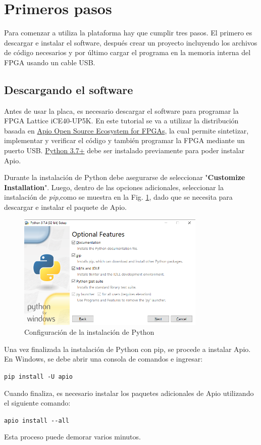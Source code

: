 \documentclass[11pt, a4paper, oneside]{article}
\begin{document}
\section{Primeros pasos}
Para comenzar a utiliza la plataforma hay que cumplir tres pasos. El primero es descargar e instalar el software, después crear un proyecto incluyendo los archivos de código necesarios y por último cargar el programa en la memoria interna del FPGA usando un cable USB.

\subsection{Descargando el software}
Antes de usar la placa, es necesario descargar el software para programar la FPGA Lattice iCE40-UP5K. En este tutorial se va a utilizar la distribución basada en \href{https://apiodoc.readthedocs.io/en/stable/index.html}{Apio Open Source Ecosystem for FPGAs}, la cual permite sintetizar, implementar y verificar el código y también programar la FPGA mediante un puerto USB. \href{https://apiodoc.readthedocs.io/en/stable/index.html}{Python 3.7+} debe ser instalado previamente para poder instalar Apio.

Durante la instalación de Python debe asegurarse de seleccionar "\textbf{Customize Installation}". Luego, dentro de las opciones adicionales, seleccionar la instalación de \textit{pip},como se muestra en la Fig. \ref{fig2}, dado que se necesita para descargar e instalar el paquete de Apio.

\begin{figure}[h!]
    \centering
    \includegraphics[width=0.8\textwidth]{figs/python_install.png}
    \caption{Configuración de la instalación de Python}
    \label{fig2}
\end{figure}

Una vez finalizada la instalación de Python con pip, se procede a instalar Apio. En Windows, se debe abrir una consola de comandos e ingresar:
\begin{center}
	\texttt{pip install -U apio}
\end{center}
Cuando finaliza, es necesario instalar los paquetes adicionales de Apio utilizando el siguiente comando:
\begin{center}
	\texttt{apio install -{}-all}
\end{center}
Esta proceso puede demorar varios minutos.
\end{document}
